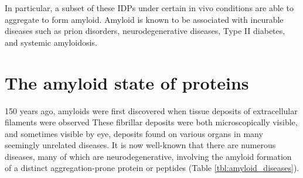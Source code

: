 In particular, a subset of these IDPs under certain in vivo conditions are able to aggregate to form amyloid. Amyloid is known to be associated with incurable diseases such as prion disorders, neurodegenerative diseases, Type II diabetes, and systemic amyloidosis. 




\section{The amyloid state of proteins}
\label{sec:amyloid}

150 years ago, amyloids were first discovered when tissue deposits of extracellular filaments were observed\cite{Haass:2007db,Sipe:2000fs} These fibrillar deposits were both microscopically visible, and sometimes visible by eye, deposits found on various organs in many seemingly unrelated diseases. It is now well-known that there are numerous diseases, many of which are neurodegenerative, involving the amyloid formation of a distinct aggregation-prone protein or peptides (Table \ref{tbl:amyloid_diseases}).

